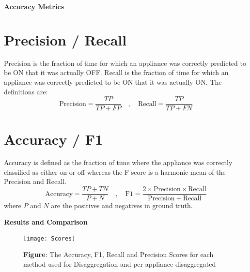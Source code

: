 \documentclass[landscape,fontscale=0.48,margin=2cm,paperwidth=135truecm,paperheight=89truecm]{baposter}
\begin{document}
\begin{poster}
\begin{posterbox}[column=2,below=auto,height = bottom]{\LARGE \bfseries Accuracy Metrics}
\section*{Precision / Recall }
Precision is the fraction of time for which an appliance was correctly predicted to be ON that it was actually OFF. Recall is the fraction of time for which an appliance was correctly predicted to be ON that it was actually ON. The definitions are:
%
\begin{equation}
    \mathrm{Precision} = \frac{TP}{TP+FP} \quad , \quad  \mathrm{Recall} =\frac{TP}{TP+FN}
\end{equation}

\section*{Accuracy / F1}
Accuracy is defined as the fraction of time where the appliance was correctly classified as either on or off whereas the F score is a harmonic mean of the Precision and Recall.
%
\begin{equation}
    \mathrm{Accuracy}  = \frac{TP+TN}{P+N} \quad , \quad  \mathrm{F1} =\frac{2\times\mathrm{Precision}\times\mathrm{Recall}}{\mathrm{Precision}+\mathrm{Recall}}
\end{equation}
where $P$ and $N$ are the positives and negatives in ground truth.
\end{posterbox}


%
\begin{posterbox}[column=3]{\LARGE \bfseries Results and Comparison}
\begin{figure}
\begin{center}
\texttt{[image: Scores]}
\caption*{\footnotesize  \textbf{Figure}: The Accuracy, F1, Recall and Precision Scores for each method used for Disaggregation and per appliance disaggregated} \vspace*{-1 cm}
\end{center}
\end{figure}



\vspace{8em}
\end{posterbox}




\end{poster}
\end{document}
